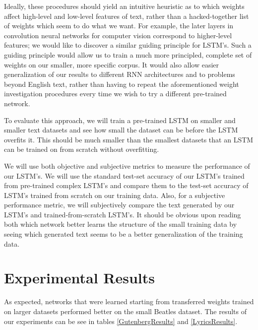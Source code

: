 \documentclass[10pt,twocolumn,letterpaper]{article}
\begin{document}
	Ideally, these procedures should yield an intuitive heuristic as to which weights affect high-level and low-level features of text, rather than a hacked-together list of weights which seem to do what we want. For example, the later layers in convolution neural networks for computer vision correspond to higher-level features; we would like to discover a similar guiding principle for LSTM's. Such a guiding principle would allow us to train a much more principled, complete set of weights on our smaller, more specific corpus. It would also allow easier generalization of our results to different RNN architectures and to problems beyond English text, rather than having to repeat the aforementioned weight investigation procedures every time we wish to try a different pre-trained network.
	
	To evaluate this approach, we will train a pre-trained LSTM on smaller and smaller text datasets and see how small the dataset can be before the LSTM overfits it. This should be much smaller than the smallest datasets that an LSTM can be trained on from scratch without overfitting.
	
	We will use both objective and subjective metrics to measure the performance of our LSTM's. We will use the standard test-set accuracy of our LSTM's trained from pre-trained complex LSTM's and compare them to the test-set accuracy of LSTM's trained from scratch on our training data. Also, for a subjective performance metric, we will subjectively compare the text generated by our LSTM's and trained-from-scratch LSTM's. It should be obvious upon reading both which network better learns the structure of the small training data by seeing which generated text seems to be a better generalization of the training data.
\section{Experimental Results}
	As expected, networks that were learned starting from transferred weights trained on larger datasets performed better on the small Beatles dataset. The results of our experiments can be see in tables \ref{GutenbergResults} and \ref{LyricsResults}.
	
\end{document}
